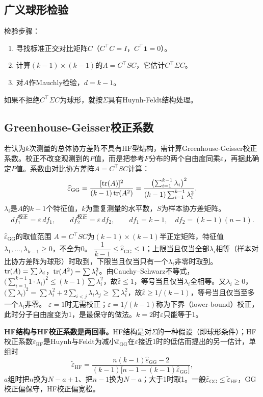\subsection{广义球形检验}
检验步骤：
\begin{enumerate}
\item 寻找标准正交对比矩阵$C$（$C^\top C=I$，$C^\top\mathbf 1=0$）。
\item 计算$(k-1)\times(k-1)$的$A=C^\top SC$，它估计$C^\top\Sigma C$。
\item 对$A$作Mauchly检验，$d=k-1$。
\end{enumerate}
如果不拒绝$C^\top\Sigma C$为球形，就按$\Sigma$具有Huynh-Feldt结构处理。
\subsection{Greenhouse-Geisser校正系数}
若认为$k$次测量的总体协方差阵不具有HF型结构，需计算Greenhouse-Geisser校正系数。校正不改变观测到的$F$值，而是把参考$F$分布的两个自由度同乘$\varepsilon$，再据此确定$P$值。系数由对比协方差阵$A=C^\top SC$计算：
\[
\widehat\varepsilon_{\mathrm{GG}}
=\frac{[\operatorname{tr}(A)]^2}{(k-1)\operatorname{tr}(A^2)}
=\frac{\bigl(\sum_{i=1}^{k-1}\lambda_i\bigr)^2}{(k-1)\sum_{i=1}^{k-1}\lambda_i^2}.
\]
$\lambda_i$是$A$的$k-1$个特征值，$k$为重复测量的水平数，$S$为样本协方差矩阵。
\[
df_1^{\text{校正}}=\varepsilon\, df_1,\qquad
df_2^{\text{校正}}=\varepsilon\, df_2,
\qquad df_1=k-1,\quad df_2=(k-1)(n-1).
\]
\begin{derivation}{$\widehat\varepsilon_{\mathrm{GG}}$的取值范围}
$A=C^\top SC$为$(k-1)\times(k-1)$半正定矩阵，特征值$\lambda_1,\ldots,\lambda_{k-1}\ge0$，不全为0。
$\dfrac1{k-1}\le\widehat\varepsilon_{\mathrm{GG}}\le1$；上限当且仅当全部$\lambda_i$相等（样本对比协方差阵为球形）时取到，下限当且仅当只有一个$\lambda_i$非零时取到。
$\operatorname{tr}(A)=\sum\lambda_i$，$\operatorname{tr}(A^2)=\sum\lambda_i^2$。由Cauchy--Schwarz不等式，$\bigl(\sum_{i=1}^{k-1}1\cdot\lambda_i\bigr)^2\le(k-1)\sum\lambda_i^2$，故$\widehat\varepsilon\le1$，等号当且仅当$\lambda_i$全相等。又$\lambda_i\ge0$，$\bigl(\sum\lambda_i\bigr)^2=\sum\lambda_i^2+2\sum_{i<j}\lambda_i\lambda_j\ge\sum\lambda_i^2$，故$\widehat\varepsilon\ge1/(k-1)$，等号当且仅当至多一个$\lambda_i$非零。
$\varepsilon=1$时无需校正；$\varepsilon=1/(k-1)$称为下界（lower-bound）校正，此时分子自由度变为1，是最保守的做法。$k=2$时$\varepsilon$只能等于1。
\end{derivation}
\textbf{HF结构与HF校正系数是两回事。}HF结构是对$\Sigma$的一种假设（即球形条件）；HF校正系数$\widetilde\varepsilon_{\mathrm{HF}}$是Huynh与Feldt为减小$\widehat\varepsilon_{\mathrm{GG}}$在$\varepsilon$接近1时的低估而提出的另一估计，单组时
\[
\widetilde\varepsilon_{\mathrm{HF}}=\frac{n(k-1)\widehat\varepsilon_{\mathrm{GG}}-2}{(k-1)\bigl[n-1-(k-1)\widehat\varepsilon_{\mathrm{GG}}\bigr]},
\]
$a$组时把$n$换为$N-a+1$、把$n-1$换为$N-a$；大于1时取1。一般$\widehat\varepsilon_{\mathrm{GG}}\le\widetilde\varepsilon_{\mathrm{HF}}$，GG校正偏保守，HF校正偏宽松。
